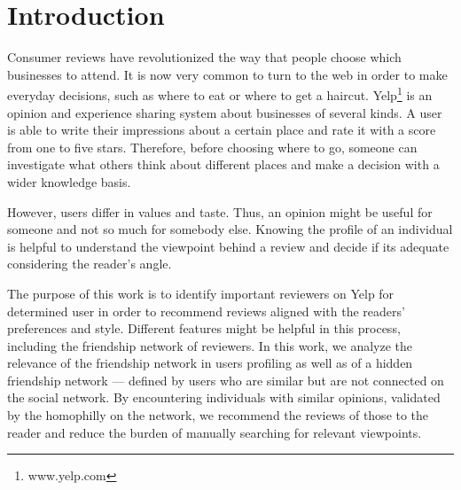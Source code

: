 \section{Introduction}
Consumer reviews have revolutionized the way that people choose which businesses to attend. It is now very common to turn to the web in order to make everyday decisions, such as where to eat or where to get a haircut. Yelp\footnote{www.yelp.com} is an opinion and experience sharing system about businesses of several kinds. A user is able to write their impressions about a certain place and rate it with a score from one to five stars. Therefore, before choosing where to go, someone can investigate what others think about different places and make a decision with a wider knowledge basis.

However, users differ in values and taste. Thus, an opinion might be useful for someone and not so much for somebody else. Knowing the profile of an individual is helpful to understand the viewpoint behind a review and decide if its adequate considering the reader's angle.

The purpose of this work is to identify important reviewers on Yelp for determined user in order to recommend reviews aligned with the readers' preferences and style. Different features might be helpful in this process, including the friendship network of reviewers. In this work, we analyze the relevance of the friendship network in users profiling as well as of a hidden friendship network --- defined by users who are similar but are not connected on the social network. By encountering individuals with similar opinions, validated by the homophilly on the network, we recommend the reviews of those to the reader and reduce the burden of manually searching for relevant viewpoints.
